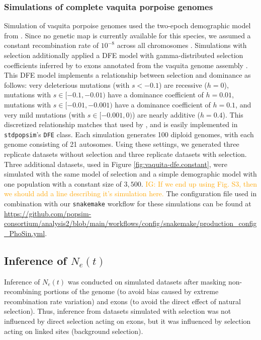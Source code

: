 \documentclass[hidelinks]{article}
\newcommand{\stdpopsim}{\texttt{stdpopsim}\xspace}
\newcommand{\snakemake}{\texttt{snakemake}\xspace}
\newcommand{\igcomment}[1]{\textcolor{orange}{IG: #1}}
\begin{document}
    \subsubsection*{Simulations of complete vaquita porpoise genomes}
    Simulation of vaquita porpoise genomes used 
    the two-epoch demographic model from \citet[\stdpopsim label \texttt{Vaquita2Epoch\_1R22}]{robinson2022critically}.
    Since no genetic map is currently available for this species, we assumed a constant recombination rate of  $10^{-8}$
    across all chromosomes \citep{morin2021}.
    Simulations with selection additionally applied a DFE model with gamma-distributed selection coefficients inferred by
    \citet[\stdpopsim label \texttt{Gamma\_R22}]{robinson2022critically}  to exons annotated from the vaquita genome assembly
    \citet[\stdpopsim label \texttt{Phocoena\_sinus.mPhoSin1.pri.110\_exons}]{morin2021}.
    This DFE model implements a relationship between selection and dominance as follows:
    very deleterious mutations (with $s<-0.1$) are recessive ($h=0$),
    mutations with $s\in [-0.1,-0.01)$ have a dominance coefficient of $h=0.01$,
    mutations with $s\in [-0.01,-0.001)$ have a dominance coefficient of $h=0.1$,
    and very mild mutations (with $s\in [-0.001,0)$) are nearly additive ($h=0.4$).
    This discretized relationship matches that used by \textcite{robinson2022critically},
    and is easily implemented in \stdpopsim's \texttt{DFE} class.
    Each simulation generates 100 diploid genomes,
    with each genome consisting of 21 autosomes.
    Using these settings, we generated three replicate datasets without selection
    and three replicate datasets with selection.
    Three additional datasets, used in Figure \ref{fig:vaquita-dfe.constant},
    were simulated with the same model of selection and a simple demographic model with one population with a constant size of $3,500$.
    \igcomment{If we end up using Fig. S3, then we should add a line describing it's simulation here.}
    The configuration file used in combination with our \snakemake workflow
    for these simulations can be found at 
    \url{https://github.com/popsim-consortium/analysis2/blob/main/workflows/config/snakemake/production_config_PhoSin.yml}.


    \subsection*{Inference of $N_e(t)$}
    Inference of $N_e(t)$ was conducted on simulated datasets after masking non-recombining portions
    of the genome (to avoid bias caused by extreme recombination rate variation)
    and exons (to avoid the direct effect of natural selection).
    Thus, inference from datasets simulated with selection was not influenced by direct selection
    acting on exons, but it was influenced by selection acting on linked sites (background selection).    
\end{document}
